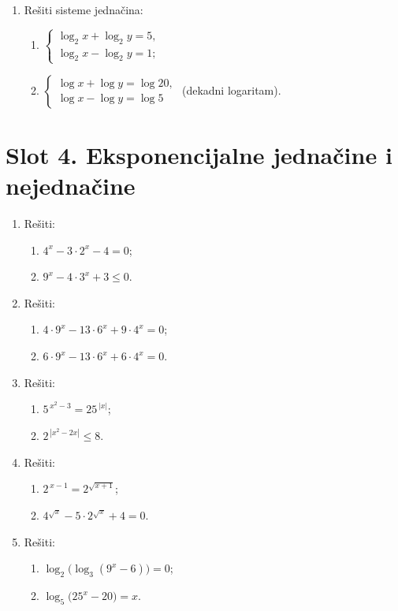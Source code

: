 \begin{enumerate}[label=\arabic*.]
\item Rešiti sisteme jednačina:
\begin{enumerate}[label=\alph*)]
\item $\begin{cases}\log_{2}x+\log_{2}y=5,\\[2pt] \log_{2}x-\log_{2}y=1;\end{cases}$
\item $\begin{cases}\log x+\log y=\log 20,\\[2pt] \log x-\log y=\log 5\end{cases}$ (dekadni logaritam).
\end{enumerate}
\end{enumerate}
\clearpage
\section*{Slot 4. Eksponencijalne jednačine i nejednačine}
\begin{enumerate}[label=\arabic*.]
\item Rešiti:
\begin{enumerate}[label=\alph*)]
\item $4^{x}-3\cdot 2^{x}-4=0$;
\item $9^{x}-4\cdot 3^{x}+3\le 0$.
\end{enumerate}

\item Rešiti:
\begin{enumerate}[label=\alph*)]
\item $4\cdot 9^{x}-13\cdot 6^{x}+9\cdot 4^{x}=0$;
\item $6\cdot 9^{x}-13\cdot 6^{x}+6\cdot 4^{x}=0$.
\end{enumerate}

\item Rešiti:
\begin{enumerate}[label=\alph*)]
\item $5^{\,x^{2}-3}=25^{\,|x|}$;
\item $2^{\,|x^{2}-2x|}\le 8$.
\end{enumerate}

\item Rešiti:
\begin{enumerate}[label=\alph*)]
\item $2^{\,x-1}=2^{\sqrt{x+1}}$;
\item $4^{\sqrt{x}}-5\cdot 2^{\sqrt{x}}+4=0$.
\end{enumerate}

\item Rešiti:
\begin{enumerate}[label=\alph*)]
\item $\log_{2}\big(\log_{3}(9^{x}-6)\big)=0$;
\item $\log_{5}\big(25^{x}-20\big)=x$.
\end{enumerate}
\end{enumerate}
\clearpage
